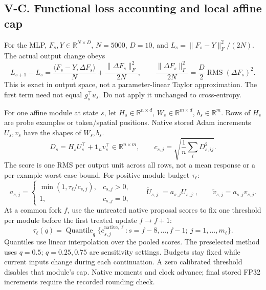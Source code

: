 \subsection*{V-C. Functional loss accounting and local affine cap}
For the MLP, $F_s,Y\in\mathbb R^{N\times D}$, $N=5000$, $D=10$,
and $L_s=\|F_s-Y\|_F^2/(2N)$. The actual output change obeys
\begin{equation}
L_{s+1}-L_s=
\frac{\langle F_s-Y,\Delta F_s\rangle}{N}
+\frac{\|\Delta F_s\|_F^2}{2N},\qquad
\frac{\|\Delta F_s\|_F^2}{2N}=\frac D2\operatorname{RMS}(\Delta F_s)^2.
\label{consol:functional-loss}
\end{equation}
This is exact in output space, not a parameter-linear Taylor approximation.
The first term need not equal $g_s^\top u_s$. Do not apply it unchanged to
cross-entropy.

For one affine module at state $s$, let
$H_s\in\mathbb R^{n\times d}$, $W_s\in\mathbb R^{m\times d}$,
$b_s\in\mathbb R^m$. Rows of $H_s$ are probe examples or token/spatial positions.
Native stored Adam increments $U_s,v_s$ have the shapes of $W_s,b_s$.
\begin{equation}
D_s=H_sU_s^\top+\mathbf1_n v_s^\top\in\mathbb R^{n\times m},\qquad
c_{s,j}=\sqrt{\frac1n\sum_iD_{s,ij}^2}.
\label{consol:cap-score}
\end{equation}
The score is one RMS per output unit across all rows, not a mean response or
a per-example worst-case bound. For positive module budget $\tau_\ell$:
\begin{equation}
a_{s,j}=
\begin{cases}\min(1,\tau_\ell/c_{s,j}),&c_{s,j}>0,\\1,&c_{s,j}=0,\end{cases}
\qquad
\widetilde U_{s,j:}=a_{s,j}U_{s,j:},\qquad
\widetilde v_{s,j}=a_{s,j}v_{s,j}.
\label{consol:cap-rule}
\end{equation}
At a common fork $f$, use the untreated native proposal scores to fix one
threshold per module before the first treated update $f\to f+1$:
\begin{equation}
\tau_\ell(q)=\operatorname{Quantile}_q
\{c^{\mathrm{native},\ell}_{s,j}:s=f-8,\ldots,f-1;\ j=1,\ldots,m_\ell\}.
\label{consol:cap-calibration}
\end{equation}
Quantiles use linear interpolation over the pooled scores. The preselected
method uses $q=0.5$; $q=0.25,0.75$ are sensitivity settings. Budgets stay fixed
while current inputs change during each continuation. A zero
calibrated threshold disables that module's cap. Native moments and clock advance;
final stored FP32 increments require the recorded rounding check.


